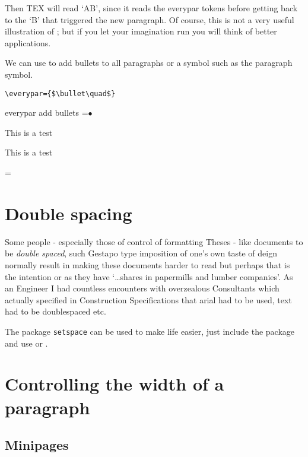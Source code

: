 Then TEX will read `AB', since it reads the everypar tokens before getting back to the
`B' that triggered the new paragraph. Of course, this is not a very useful illustration of
; but if you let your imagination run you will think of better applications.



We can use  to add bullets to all paragraphs or a symbol such as the paragraph symbol.
\medskip

\verb+\everypar={$\bullet\quad$}+

\begin{texexample}{everypar add bullets}{}
\everypar={$\bullet\quad$}

This is a test

This is a test

\everypar={}
\end{texexample}

\section{Double spacing}
Some people - especially those of control of formatting Theses - like documents to be \textit{double spaced}, such Gestapo type imposition of one's own taste of deign normally result in making these documents harder to read but perhaps that is the intention or as \cite{Abrahams2003} \cite{Wilson2009} they have `\ldots shares in papermills and lumber companies'. As an Engineer I had countless encounters with overzealous Consultants which actually specified in Construction Specifications that arial had to be used, text had to be doublespaced etc. 

The package \texttt{setspace} \cite{setspace} can be used to make life easier, just include the package and use  or .

\section{Controlling the width of a paragraph}
\subsection{Minipages}


